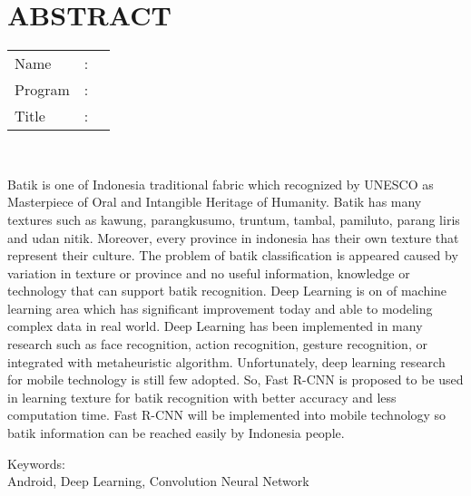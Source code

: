 %
%
%

\chapter*{ABSTRACT}

\vspace*{0.2cm}

\noindent \begin{tabular}{l l p{11.0cm}}
	Name&: & \penulis \\
	Program&: & \program \\
	Title&: & \judulInggris \\
\end{tabular} \\ 

\vspace*{0.5cm}

\noindent Batik is one of Indonesia traditional fabric which recognized by UNESCO as Masterpiece of Oral and Intangible Heritage of Humanity. Batik has many textures such as kawung, parangkusumo, truntum, tambal, pamiluto, parang liris and udan nitik. Moreover, every province in indonesia has their own texture that represent their culture. The problem of batik classification is appeared caused by variation in texture or province and no useful information, knowledge or technology that can support batik recognition. Deep Learning is on of machine learning area which has significant improvement today and able to modeling complex data in real world. Deep Learning has been implemented in many research such as face recognition, action recognition, gesture recognition, or integrated with metaheuristic algorithm. Unfortunately, deep learning research for mobile technology is still few adopted. So, Fast R-CNN is proposed to be used in learning texture for batik recognition with better accuracy and less computation time. Fast R-CNN will be implemented into mobile technology so batik information can be reached easily by Indonesia people.\\

\vspace*{0.2cm}

\noindent Keywords: \\ 
\noindent Android, Deep Learning, Convolution Neural Network
\newpage